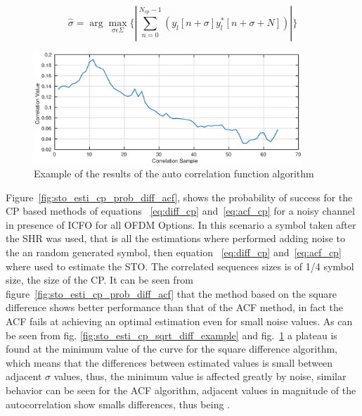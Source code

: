 \begin{equation} 
\hat{\sigma} = \arg\max\limits_{\sigma \epsilon \Sigma}  \{ |\sum\limits_{n=0}^{N_{cp}-1} ( y_l[n+\sigma]y_{l}^{*}[n+\sigma+N]) | \} 
    \label{eq:acf_cp} 
\end{equation}

\begin{figure}[hbt]
  \centering
    \includegraphics[width=0.9\textwidth]
      {./figures/time_estimation_example_cps_acf}
  \caption{Example of the results of the auto correlation function algorithm}
  \label{fig:sto_esti_cp_sqrt_acf_example}
\end{figure}


Figure~\ref{fig:sto_esti_cp_prob_diff_acf}, shows the probability of success for the CP based methods of equations ~\ref{eq:diff_cp} and~\ref{eq:acf_cp} for a noisy channel in presence of ICFO for all OFDM Options. In this scenario a symbol taken after the SHR was used, that is all the estimations where performed adding noise to the an random generated symbol, then equation ~\ref{eq:diff_cp} and~\ref{eq:acf_cp} where used to estimate the STO. The correlated sequences sizes is of 1/4 symbol size, the size of the CP. It can be seen from figure~\ref{fig:sto_esti_cp_prob_diff_acf} that the method based on the square difference shows better performance than that of the ACF method, in fact the ACF fails at achieving an optimal estimation even for small noise values. As can be seen from fig. \ref{fig:sto_esti_cp_sqrt_diff_example} and fig.~\ref{fig:sto_esti_cp_sqrt_acf_example} a plateau is found at the minimum value of the curve for the square difference algorithm, which means that the differences between estimated values is small between adjacent $\sigma$ values, thus, the minimum value is affected greatly by noise, similar behavior can be seen for the ACF algorithm, adjacent values in magnitude of the autocorrelation show smalls differences, thus being . %

